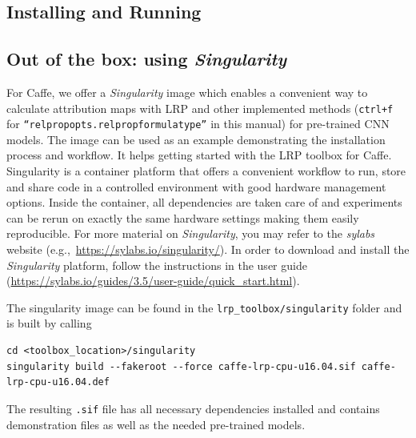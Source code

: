\documentclass[a4wide]{article}
\begin{document}
\subsection*{Installing and Running}

\subsection*{Out of the box: using \emph{Singularity}}
For Caffe, we offer a \emph{Singularity} image which enables a convenient way to calculate attribution maps with LRP and other implemented methods (\texttt{ctrl+f} for \texttt{``relpropopts.relpropformulatype''} in this manual) for pre-trained CNN models.
The image can be used as an example demonstrating the installation process and workflow. It helps getting started with the LRP toolbox for Caffe.
Singularity \cite{kurtzer2017singularity} is a container platform that offers a convenient workflow to run, store and share code in a controlled environment with good hardware management options.
Inside the container, all dependencies are taken care of and experiments can be rerun on exactly the same hardware settings making them easily reproducible.
For more material on \emph{Singularity}, you may refer to the \emph{sylabs} website (e.g.,~\url{https://sylabs.io/singularity/}).
In order to download and install the \emph{Singularity} platform, follow the instructions in the user guide (\url{https://sylabs.io/guides/3.5/user-guide/quick\_start.html}).

The singularity image can be found in the \verb!lrp_toolbox/singularity! folder and  is built by calling
\begin{Verbatim}[frame = single]
cd <toolbox_location>/singularity
singularity build --fakeroot --force caffe-lrp-cpu-u16.04.sif caffe-lrp-cpu-u16.04.def
\end{Verbatim}
The resulting \verb!.sif! file has all necessary dependencies installed and contains demonstration files as well as the needed pre-trained models.
\end{document}
